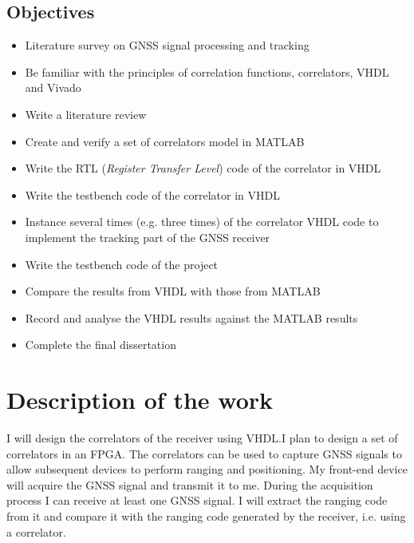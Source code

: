\subsection{Objectives}
\begin{itemize}
    \item Literature survey on GNSS signal processing and tracking
    \item Be familiar with the principles of correlation functions, correlators, VHDL and Vivado
    \item Write a literature review
    \item Create and verify a set of correlators model in MATLAB
    \item Write the RTL (\textit{Register Transfer Level}) code of the correlator in VHDL
    \item Write the testbench code of the correlator in VHDL
    \item Instance several times (e.g. three times) of the correlator VHDL code to implement the tracking part of the GNSS receiver
    \item Write the testbench code of the project
    \item Compare the results from VHDL with those from MATLAB
    \item Record and analyse the VHDL results against the MATLAB results
    \item Complete the final dissertation
\end{itemize}

\section{Description of the work}
I will design the correlators of the receiver using VHDL.I plan to design a set of correlators in an FPGA. The correlators can be used to capture GNSS signals to allow subsequent devices to perform ranging and positioning. My front-end device will acquire the GNSS signal and transmit it to me. During the acquisition process I can receive at least one GNSS signal. I will extract the ranging code from it and compare it with the ranging code generated by the receiver, i.e. using a correlator.




